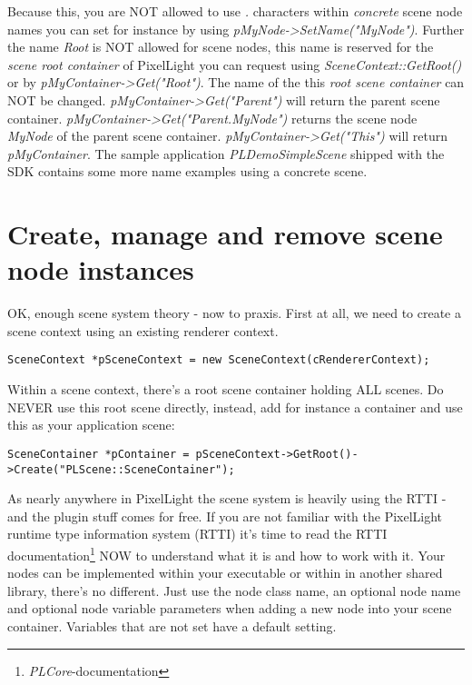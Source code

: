 Because this, you are NOT allowed to use \emph{.} characters within \emph{concrete} scene node names you can set for instance by using \emph{pMyNode->SetName("MyNode")}. Further the name \emph{Root} is NOT allowed for scene nodes, this name is reserved for the \emph{scene root container} of PixelLight you can request using \emph{SceneContext::GetRoot()} or by \emph{pMyContainer->Get("Root")}. The name of the this \emph{root scene container} can NOT be changed. \emph{pMyContainer->Get("Parent")} will return the parent scene container. \emph{pMyContainer->Get("Parent.MyNode")} returns the scene node \emph{MyNode} of the parent scene container. \emph{pMyContainer->Get("This")} will return \emph{pMyContainer}. The sample application \emph{PLDemoSimpleScene} shipped with the SDK contains some more name examples using a concrete scene.




\section{Create, manage and remove scene node instances}
OK, enough scene system theory - now to praxis. First at all, we need to create a scene context using an existing renderer context.

\begin{lstlisting}[caption=Creating a scene context instance]
SceneContext *pSceneContext = new SceneContext(cRendererContext);
\end{lstlisting}

Within a scene context, there's a root scene container holding ALL scenes. Do NEVER use this root scene directly, instead, add for instance a container and use this as your application scene:

\begin{lstlisting}[caption=Creating a new scene container instance]
SceneContainer *pContainer = pSceneContext->GetRoot()->Create("PLScene::SceneContainer");
\end{lstlisting}

As nearly anywhere in PixelLight the scene system is heavily using the RTTI - and the plugin stuff comes for free. If you are not familiar with the PixelLight runtime type information system (RTTI) it's time to read the RTTI documentation\footnote{\emph{PLCore}-documentation} NOW to understand what it is and how to work with it. Your nodes can be implemented within your executable or within in another shared library, there's no different. Just use the node class name, an optional node name and optional node variable parameters when adding a new node into your scene container. Variables that are not set have a default setting.

